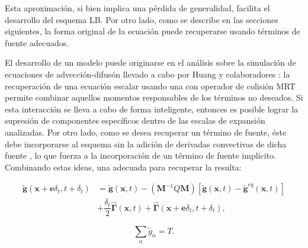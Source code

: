 Esta aproximaci\'on, si bien implica una p\'erdida de generalidad, facilita el desarrollo del esquema LB. Por otro lado, como se describe en las secciones siguientes,  la forma original de la ecuaci\'on puede recuperarse usando t\'erminos de fuente adecuados. 

El desarrollo de un modelo puede originarse en el an\'alisis sobre la simulaci\'on de ecuaciones de advecci\'on-difus\'on llevado a cabo por Huang y colaboradores \cite{huang_modified_2014, huang_numerical_2011, huang_lattice_2015}: la recuperaci\'on de una ecuaci\'on escalar usando una \lbe{} con operador de colisi\'on MRT permite combinar aquellos momentos responsables de los t\'erminos no deseados. Si esta interacci\'on se lleva a cabo de forma inteligente, entonces es posible lograr la supresi\'on de componentes espec\'ificos dentro de las escalas de expansi\'on analizadas. Por otro lado, como se desea recuperar un t\'ermino de fuente, \'este debe incorporarse al esquema sin la adici\'on de derivadas convectivas de dicha fuente \cite{cheng_introducing_2008}, lo que fuerza a la incorporaci\'on de un t\'ermino de fuente impl\'icito. Combinando estas ideas, una \lbe{} adecuada para recuperar la  resulta:

\begin{equation}
	\begin{aligned}
		\tilde{\bm{g}}(\bm{x} + \bm{e} \delta_t, t+\delta_t) &=
		\tilde{\bm{g}}(\bm{x}, t) - (\bm{M}^{-1}Q\bm{M}) \left[ \tilde{\bm{g}}(\bm{x}, t) - \tilde{\bm{g}}^{eq}(\bm{x}, t) \right] \\
		&  + \dfrac{\delta_t}{2} \hat{\bm{\Gamma}}(\bm{x},t) + \hat{\bm{\Gamma}}(\bm{x} +\bm{e}\delta_t,t + \delta_t),
	\end{aligned}
	\label{eq:g_tilde_2d}	
\end{equation}

\begin{equation}
	\sum_{\alpha} \tilde{g}_{\alpha} = T.
\end{equation}

